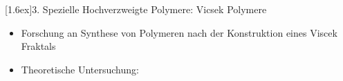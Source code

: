 \documentclass[final]{beamer}
\newlength{\columnheight}
\newlength{\marginw}
\newlength{\tw}
\newlength{\colsep}
\newlength{\colw}
\newenvironment{myTwoColPoster}{%
  \begin{minipage}[t]{\textwidth}%
    \hspace*{\marginw}%
    \hspace*{9.5bp}%
    \begin{minipage}[t]{\tw}}%
  {\end{minipage}%
   \hspace*{\marginw}%
   \end{minipage}}
\newenvironment{myCol}%
    {\begin{minipage}[t][\columnheight][t]{\colw}}%
    {\end{minipage}}
\newenvironment{textblock}[1]%
    {\begin{block}{\rule[-0.6ex]{0pt}{2.4ex}\raisebox{-0.25ex}[1.6ex]{#1}}%
     \vspace*{5mm}}%
    {\vspace*{5mm}\end{block}}
\begin{document}
\begin{frame}[t]{}
\begin{myTwoColPoster}
\begin{myCol}
\end{myCol}
\hfill
\begin{myCol}
  
  \begin{textblock}{3. Spezielle Hochverzweigte Polymere: Vicsek Polymere\cite{Werner2011}}
    \begin{itemize}\setlength\itemsep{1.4em}\large
      \item Forschung an Synthese von Polymeren nach der Konstruktion eines Viscek Fraktals
      \item Theoretische Untersuchung: 
      \printbibliography
    \end{itemize}
  \end{textblock}


\end{myCol}
\end{myTwoColPoster}
\end{frame}
\end{document}
